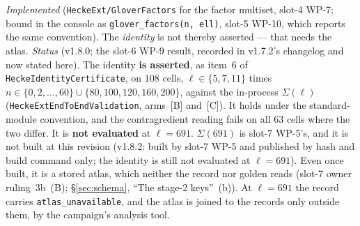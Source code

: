 \documentclass[11pt]{article}
\theoremstyle{remark}
\begin{document}
\begin{enumerate}
  \emph{Implemented} (\texttt{HeckeExt/GloverFactors} for the factor multiset, slot-4 WP-7;
  bound in the console as \texttt{glover\_factors(n, ell)}, slot-5 WP-10, which reports the
  same convention). The \emph{identity} is not thereby asserted --- that needs the atlas.
  \emph{Status} (v1.8.0; the slot-6 WP-9 result, recorded in v1.7.2's changelog and now stated
  here). The identity \textbf{is asserted}, as item~6 of \texttt{HeckeIdentityCertificate}, on
  $108$ cells, $\ell\in\{5,7,11\}$ times $n\in\{0,2,\dots,60\}\cup\{80,100,120,160,200\}$,
  against the in-process $\Sigma(\ell)$ (\texttt{HeckeExtEndToEndValidation}, arms~[B]
  and~[C]). It holds under the standard-module convention, and the
  contragredient reading fails on all $63$ cells where the two differ. It is \textbf{not
  evaluated} at $\ell=691$. $\Sigma(691)$ is slot-7 WP-5's, and it is not built at this revision
  (v1.8.2: built by slot-7 WP-5 and published by hash and build command only; the identity is
  still not evaluated at $\ell=691$).
  Even once built, it is a stored atlas, which neither the record nor golden reads (slot-7 owner
  ruling~3b~(B); \S\ref{sec:schema}, ``The stage-2 keys''~(b)). At $\ell=691$ the record carries
  \texttt{atlas\_unavailable}, and the atlas is joined to the records only outside them, by the
  campaign's analysis tool.


\end{enumerate}
\end{document}
